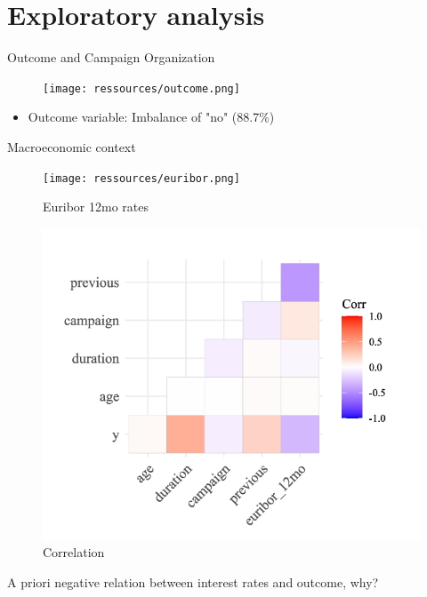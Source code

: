 \documentclass{beamer}
\begin{document}
\section{Exploratory analysis}

\begin{frame}{Outcome and Campaign Organization}
\begin{figure}
    \centering
    \texttt{[image: ressources/outcome.png]}
\end{figure}
\begin{itemize}
    \item Outcome variable: Imbalance of "no" (88.7\%)
\end{itemize}

\end{frame}

\begin{frame}{Macroeconomic context}

\begin{figure}
    \centering
    \begin{minipage}[t]{0.55\linewidth}
        \centering
        \texttt{[image: ressources/euribor.png]}
        \caption{Euribor 12mo rates}
    \end{minipage}%
    \hfill
    \begin{minipage}[t]{0.4\linewidth}
        \centering
        \includegraphics[width=\linewidth]{ressources/correlation.jpg}
        \caption{Correlation}
    \end{minipage}
\end{figure}
\vspace*{0.25cm}
A priori negative relation between interest rates and outcome, why?

\end{frame}
\end{document}
